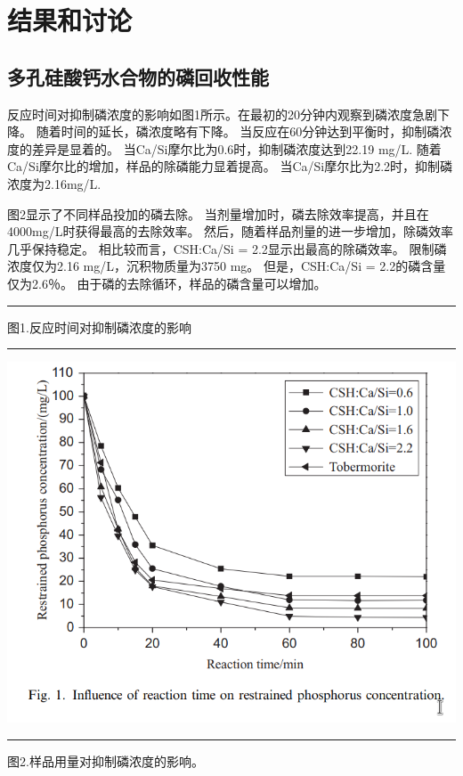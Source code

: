 \documentclass[11pt]{article}
\begin{document}
\section{结果和讨论}
\label{sec:org6fb6706}
\subsection{多孔硅酸钙水合物的磷回收性能}
\label{sec:org461681d}
反应时间对抑制磷浓度的影响如图1所示。在最初的20分钟内观察到磷浓度急剧下降。 随着时间的延长，磷浓度略有下降。 当反应在60分钟达到平衡时，抑制磷浓度的差异是显着的。 当Ca/Si摩尔比为0.6时，抑制磷浓度达到22.19 mg/L. 随着Ca/Si摩尔比的增加，样品的除磷能力显着提高。 当Ca/Si摩尔比为2.2时，抑制磷浓度为2.16mg/L.

图2显示了不同样品投加的磷去除。 当剂量增加时，磷去除效率提高，并且在4000mg/L时获得最高的去除效率。 然后，随着样品剂量的进一步增加，除磷效率几乎保持稳定。 相比较而言，CSH:Ca/Si = 2.2显示出最高的除磷效率。 限制磷浓度仅为2.16 mg/L，沉积物质量为3750 mg。 但是，CSH:Ca/Si = 2.2的磷含量仅为2.6％。 由于磷的去除循环，样品的磷含量可以增加。

\noindent\rule{\textwidth}{0.5pt}
图1.反应时间对抑制磷浓度的影响

\noindent\rule{\textwidth}{0.5pt}
\includegraphics[scale=0.3]{fig.1.png}

\noindent\rule{\textwidth}{0.5pt}
图2.样品用量对抑制磷浓度的影响。
\end{document}
